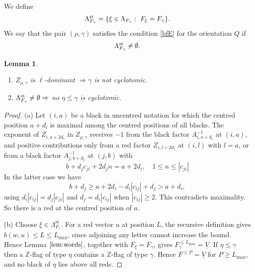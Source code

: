 \documentclass[11pt,reqno]{amsart}
\newtheorem{Lemma}[Theorem]{Lemma}
\theoremstyle{definition}
\theoremstyle{remark}
\def\bbZ{\mathbb Z}
\def\dV{\underline V}
\begin{document}
We define
\begin{align}\label{LST}
\Lambda^{\rm st}_{F_\gamma}=\{\xi\in\Lambda_{F_\gamma}:\ F_\xi=F_\gamma\}.
\end{align}
We say that the pair $(\rho,\gamma)$ satisfies the condition \eqref{bfE} for the orientation $Q$ if 
\begin{align}\label{bfE}
\Lambda^{\rm st}_{F_\gamma}\neq\emptyset.
\end{align}



\begin{Lemma}\label{lem:noncyc}\hfill
\begin{enumerate}[label=$\mathrm{(\alph*)}$,leftmargin=8mm]
\item
$Z_{\rho,\gamma}$ is $\ell$-dominant $\Rightarrow\gamma$ is not cyclotomic. 
\item
$\Lambda^{\rm st}_{F_\gamma}\neq\emptyset\Rightarrow$ no $\eta\leqslant\gamma$ is
cyclotomic.
\end{enumerate}
\end{Lemma}

\begin{proof}\hfill

(a) Let $(i,a)$ be a black in uncentred notation for which the
centred position $a+d_i$ is maximal among the centred positions of all blacks. 
The exponent of $Z_{i,a+2d_i}$ in $Z_{\rho,\gamma}$ receives $-1$ from the black factor $A_{i,a+d_i}^{-1}$ at $(i,a)$, 
and positive contributions only from a red factor $Z_{i,l+2d_i}$ at $(i,l)$ with $l=a$, or from a black 
factor $A_{j,b+d_j}^{-1}$ at $(j,b)$ with 
$$b+d_jc_{ji}+2d_jn=a+2d_i,\quad
1\leqslant n\leqslant|c_{ji}|$$
In the latter case we have
$$b+d_j\geqslant a+2d_i-d_i|c_{ij}|+d_j>a+d_i,$$ using $d_i|c_{ij}|=d_j|c_{ji}|$ and
$d_j=d_i|c_{ij}|$ when $|c_{ij}|\geqslant2$.
This contradicts maximality. So there is a red at the centred position of $a$.

(b) Choose \(\xi\in\Lambda_{F_\gamma}^{\mathrm{st}}\). 
For a red vector \(u\) at position \(L\), the recursive definition gives \(b(w,u)\leqslant L\leqslant L_{\max}\), 
since adjoining any letter cannot increase the bound. 
Hence Lemma \(\ref{lem:words}\), together with \(F_\xi=F_\gamma\), gives \(F_\gamma^{\leqslant L_{\max}}=\underline V\).
If $\eta\leqslant\gamma$ then a $\bbZ$-flag of type $\eta$ contains a $\bbZ$-flag of type $\gamma$.
Hence
$F^{\leqslant P}=\dV$ for $P\geqslant L_{\max}$, and no black of $\eta$ lies above all reds.
\end{proof}
\end{document}
